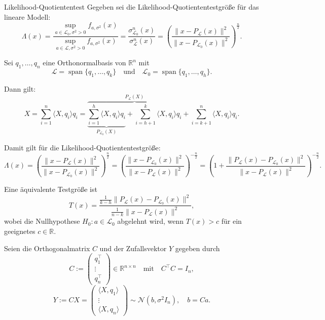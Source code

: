 \begin{defi}{Likelihood-Quotiententest}
    Gegeben sei die Likelihood-Quotiententestgröße für das lineare Modell:
    \[
        \Lambda(x) = \frac{\sup_{a \in \mathcal{L}_0, \sigma^2 > 0} f_{a, \sigma^2}(x)}{\sup_{a \in \mathcal{L}, \sigma^2 > 0} f_{a, \sigma^2}(x)} = \frac{\sigma_{\mathcal{L}_0}^n(x)}{\sigma_{\mathcal{L}}^n(x)} = \left( \frac{\| x - P_{\mathcal{L}}(x) \|^2}{\| x - P_{\mathcal{L}_0}(x) \|^2} \right)^{\frac{n}{2}}.
    \]

    Sei $q_1, \ldots, q_n$ eine Orthonormalbasis von $\mathbb{R}^n$ mit
    \[
        \mathcal{L} = \operatorname{span} \{ q_1, \ldots, q_k \} \quad \text{und} \quad \mathcal{L}_0 = \operatorname{span} \{ q_1, \ldots, q_h \}.
    \]

    Dann gilt:
    \[
        X = \sum_{i = 1}^{n} \langle X, q_i \rangle q_i = \overbrace{\underbrace{\sum_{i = 1}^{h} \langle X, q_i \rangle q_i}_{P_{\mathcal{L}_0}(X)} + \sum_{i = h + 1}^{k} \langle X, q_i \rangle q_i}^{P_{\mathcal{L}}(X)} + \sum_{i = k + 1}^{n} \langle X, q_i \rangle q_i.
    \]

    Damit gilt für die Likelihood-Quotiententestgröße:
    \[
        \Lambda(x) = \left( \frac{\| x - P_{\mathcal{L}}(x) \|^2}{\| x - P_{\mathcal{L}_0}(x) \|^2} \right)^{\frac{n}{2}} = \left( \frac{\| x - P_{\mathcal{L}_0}(x) \|^2}{\| x - P_{\mathcal{L}}(x) \|^2} \right)^{-\frac{n}{2}} = \left( 1 + \frac{\| P_{\mathcal{L}}(x) - P_{\mathcal{L}_0}(x) \|^2}{\| x - P_{\mathcal{L}}(x) \|^2} \right)^{-\frac{n}{2}}.
    \]

    Eine äquivalente Testgröße ist
    \[
        T(x) = \frac{\frac{1}{k - h} \| P_{\mathcal{L}}(x) - P_{\mathcal{L}_0}(x) \|^2}{\frac{1}{n - k} \| x - P_{\mathcal{L}}(x) \|^2},
    \]
    wobei die Nullhypothese $H_0: a \in \mathcal{L}_0$ abgelehnt wird, wenn $T(x) > c$ für ein geeignetes $c \in \mathbb{R}$.

    Seien die Orthogonalmatrix $C$ und der  Zufallsvektor $Y$ gegeben durch
    \[
        C := \begin{pmatrix} q_1^{\top} \\ \vdots \\ q_n^{\top} \end{pmatrix} \in \mathbb{R}^{n \times n} \quad \text{mit} \quad C^{\top} C = I_n,
    \]
    \[
        Y := C X = \begin{pmatrix} \langle X, q_1 \rangle \\ \vdots \\ \langle X, q_n \rangle \end{pmatrix} \sim \mathcal{N}(b, \sigma^2 I_n), \quad b = C a.
    \]


\end{defi}
